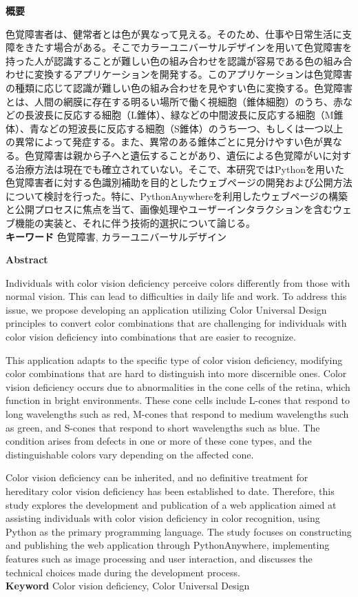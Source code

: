 \centerline{
  \huge\textbf{概要}
}
\vspace{1cm}
\noindent
\space 色覚障害者は、健常者とは色が異なって見える。そのため、仕事や日常生活に支障をきたす場合がある。そこでカラーユニバーサルデザインを用いて色覚障害を持った人が認識することが難しい色の組み合わせを認識が容易である色の組み合わせに変換するアプリケーションを開発する。このアプリケーションは色覚障害の種類に応じて認識が難しい色の組み合わせを見やすい色に変換する。色覚障害とは、人間の網膜に存在する明るい場所で働く視細胞（錐体細胞）のうち、赤などの長波長に反応する細胞（L錐体）、緑などの中間波長に反応する細胞（M錐体）、青などの短波長に反応する細胞（S錐体）のうち一つ、もしくは一つ以上の異常によって発症する。また、異常のある錐体ごとに見分けやすい色が異なる。色覚障害は親から子へと遺伝することがあり、遺伝による色覚障がいに対する治療方法は現在でも確立されていない。そこで、本研究ではPythonを用いた色覚障害者に対する色識別補助を目的としたウェブページの開発および公開方法について検討を行った。特に、PythonAnywhereを利用したウェブページの構築と公開プロセスに焦点を当て、画像処理やユーザーインタラクションを含むウェブ機能の実装と、それに伴う技術的選択について論じる。\\

\noindent\textbf{キーワード} \indent 色覚障害, カラーユニバーサルデザイン

\newpage

\centerline{
  \huge\textbf{Abstract}
}
\vspace{1cm}
\noindent
\space Individuals with color vision deficiency perceive colors differently from those with normal vision. This can lead to difficulties in daily life and work. To address this issue, we propose developing an application utilizing Color Universal Design principles to convert color combinations that are challenging for individuals with color vision deficiency into combinations that are easier to recognize.

This application adapts to the specific type of color vision deficiency, modifying color combinations that are hard to distinguish into more discernible ones. Color vision deficiency occurs due to abnormalities in the cone cells of the retina, which function in bright environments. These cone cells include L-cones that respond to long wavelengths such as red, M-cones that respond to medium wavelengths such as green, and S-cones that respond to short wavelengths such as blue. The condition arises from defects in one or more of these cone types, and the distinguishable colors vary depending on the affected cone.

Color vision deficiency can be inherited, and no definitive treatment for hereditary color vision deficiency has been established to date. Therefore, this study explores the development and publication of a web application aimed at assisting individuals with color vision deficiency in color recognition, using Python as the primary programming language. The study focuses on constructing and publishing the web application through PythonAnywhere, implementing features such as image processing and user interaction, and discusses the technical choices made during the development process.\\

\noindent\textbf{\textsf{Keyword}} \indent Color vision deficiency, Color Universal Design